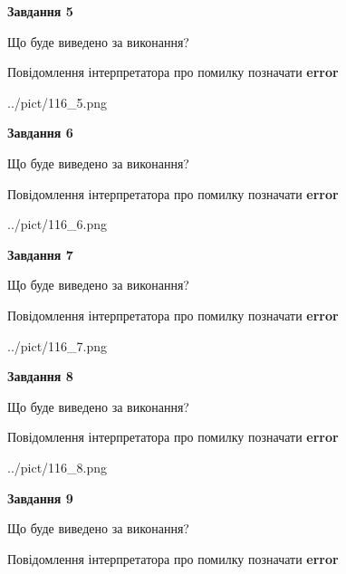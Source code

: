 \documentclass[11pt, ukrainian]{article}
\begin{document}
{\begin {large}
{\begin {center}\textbf{Завдання 5}\end {center}}\par
Що буде виведено за виконання? \par
Повідомлення інтерпретатора про помилку позначати \textbf{error}

\begin{center}
	{../pict/116_5.png}
\end{center}
\newpage

{\begin {center}\textbf{Завдання 6}\end {center}}\par
Що буде виведено за виконання? \par
Повідомлення інтерпретатора про помилку позначати \textbf{error}

\begin{center}
	{../pict/116_6.png}
\end{center}
\newpage

{\begin {center}\textbf{Завдання 7}\end {center}}\par
Що буде виведено за виконання? \par
Повідомлення інтерпретатора про помилку позначати \textbf{error}

\begin{center}
	{../pict/116_7.png}
\end{center}
\newpage

{\begin {center}\textbf{Завдання 8}\end {center}}\par
Що буде виведено за виконання? \par
Повідомлення інтерпретатора про помилку позначати \textbf{error}

\begin{center}
	{../pict/116_8.png}
\end{center}
\newpage

{\begin {center}\textbf{Завдання 9}\end {center}}\par
Що буде виведено за виконання? \par
Повідомлення інтерпретатора про помилку позначати \textbf{error}


\end{large}}
\end{document}
